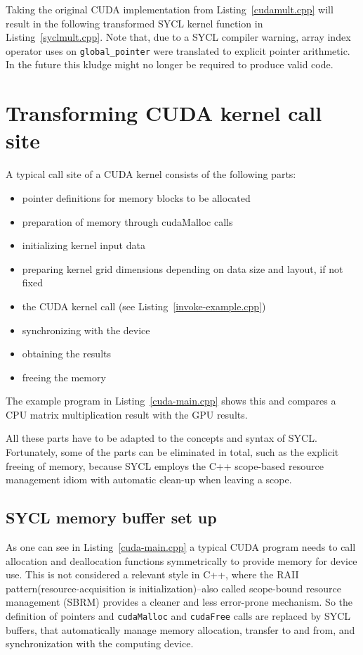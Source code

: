 \documentclass[sigconf]{acmart}
\newcommand{\inputcode}[2]{}
\newcommand{\inputsycl}[2]{}
\newcommand{\tcode}[1]{\texttt{#1}}
\begin{document}
Taking the original CUDA implementation from Listing~\ref{cudamult.cpp} will result in the following transformed SYCL kernel function in Listing~\ref{syclmult.cpp}. Note that, due to a SYCL compiler warning, array index operator uses on \tcode{global_pointer} were translated to explicit pointer arithmetic. In the future this kludge might no longer be required to produce valid code.
\inputcode{cudamult.cpp}{CUDA matrix multiplication kernel}
\inputsycl{syclmult.cpp}{Transformed SYCL kernel function}

\section{Transforming CUDA kernel call site}
A typical call site of a CUDA kernel consists of the following parts:
\begin{itemize}
\item pointer definitions for memory blocks to be allocated
\item preparation of memory through cudaMalloc calls
\item initializing kernel input data
\item preparing kernel grid dimensions depending on data size and layout, if not fixed
\item the CUDA kernel call (see Listing~\ref{invoke-example.cpp})
\item synchronizing with the device
\item obtaining the results
\item freeing the memory
\end{itemize}
The example program in Listing~\ref{cuda-main.cpp} shows this and compares a CPU matrix multiplication result with the GPU results.

All these parts have to be adapted to the concepts and syntax of SYCL. Fortunately, some of the parts can be eliminated in total, such as the explicit freeing of memory, because SYCL employs the C++ scope-based resource management idiom with automatic clean-up when leaving a scope.

\subsection{SYCL memory buffer set up}
As one can see in Listing~\ref{cuda-main.cpp} a typical CUDA program needs to call allocation and deallocation functions symmetrically to provide memory for device use. This is not considered a relevant style in C++, where the RAII pattern(resource-acquisition is initialization)--also called scope-bound resource management (SBRM) provides a cleaner and less error-prone mechanism. So the definition of pointers and \tcode{cudaMalloc} and \tcode{cudaFree} calls are replaced by SYCL buffers, that automatically manage memory allocation, transfer to and from, and synchronization with the computing device.
\end{document}
